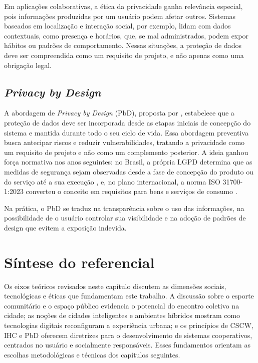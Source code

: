         Em aplicações colaborativas, a ética da privacidade ganha relevância especial, pois informações produzidas por um usuário podem afetar outros. Sistemas baseados em localização e interação social, por exemplo, lidam com dados contextuais, como presença e horários, que, se mal administrados, podem expor hábitos ou padrões de comportamento. Nessas situações, a proteção de dados deve ser compreendida como um requisito de projeto, e não apenas como uma obrigação legal.

        \subsection{\textit{Privacy by Design}}

        A abordagem de \textit{Privacy by Design} (PbD), proposta por , estabelece que a proteção de dados deve ser incorporada desde as etapas iniciais de concepção do sistema e mantida durante todo o seu ciclo de vida. Essa abordagem preventiva busca antecipar riscos e reduzir vulnerabilidades, tratando a privacidade como um requisito de projeto e não como um complemento posterior. A ideia ganhou força normativa nos anos seguintes: no Brasil, a própria LGPD determina que as medidas de segurança sejam observadas desde a fase de concepção do produto ou do serviço até a sua execução \cite{LGPD2018}, e, no plano internacional, a norma ISO 31700-1:2023 converteu o conceito em requisitos para bens e serviços de consumo \cite{ISO31700}.

        Na prática, o PbD se traduz na transparência sobre o uso das informações, na possibilidade de o usuário controlar sua visibilidade e na adoção de padrões de design que evitem a exposição indevida.

    \section{Síntese do referencial}

    Os eixos teóricos revisados neste capítulo discutem as dimensões sociais, tecnológicas e éticas que fundamentam este trabalho. A discussão sobre o esporte comunitário e o espaço público evidencia o potencial do encontro coletivo na cidade; as noções de cidades inteligentes e ambientes híbridos mostram como tecnologias digitais reconfiguram a experiência urbana; e os princípios de CSCW, IHC e PbD oferecem diretrizes para o desenvolvimento de sistemas cooperativos, centrados no usuário e socialmente responsáveis. Esses fundamentos orientam as escolhas metodológicas e técnicas dos capítulos seguintes.